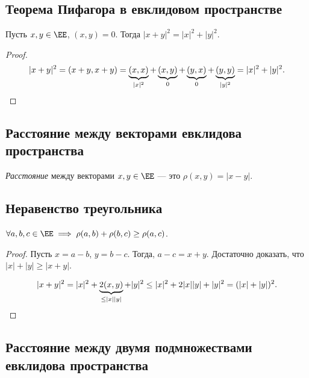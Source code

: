 \subsection{Теорема Пифагора в евклидовом пространстве}

\begin{theorem}
    Пусть $x, y \in \EE$, $(x, y) = 0$. Тогда $|x + y|^2 = |x|^2 + |y|^2$.
\end{theorem}

\begin{proof}
    \begin{equation*}
        |x + y|^2 = (x + y, x + y) = \underbrace{(x, x)}_{|x|^2} + \underbrace{(x, y)}_{0} + \underbrace{(y, x)}_{0} + \underbrace{(y, y)}_{|y|^2} = |x|^2 + |y|^2
    .\qedhere\end{equation*}
\end{proof}


\subsection{Расстояние между векторами евклидова пространства}

\begin{definition}
    \textit{Расстояние} между векторами $x, y \in \EE$ --- это $\rho(x, y) = |x - y|$.
\end{definition}


\subsection{Неравенство треугольника}

\begin{proposal}
    $\forall a, b, c \in \EE \implies \rho(a, b) + \rho(b, c) \geq \rho(a, c)$.
\end{proposal}

\begin{proof}
    Пусть $x = a - b$, $y = b - c$. Тогда, $a - c = x + y$.
    Достаточно доказать, что $|x| + |y| \geq |x + y|$.

    \begin{equation*}
        |x + y|^2 = |x|^2 + \underbrace{2(x, y)}_{\leq |x||y|} + |y|^2 \leq |x|^2 + 2|x||y| + |y|^2 = (|x| + |y|)^2
    .\qedhere\end{equation*}
\end{proof}


\subsection{Расстояние между двумя подмножествами евклидова пространства}

